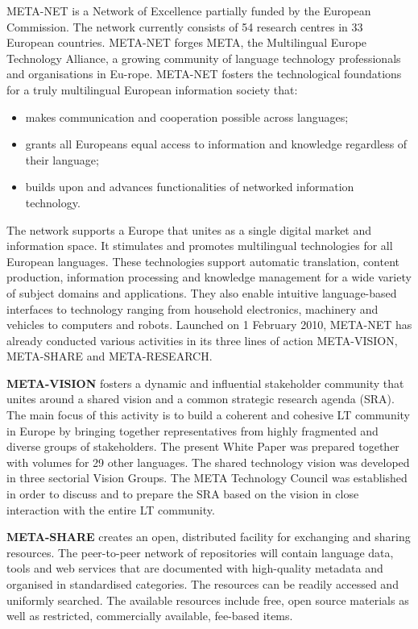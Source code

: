 \begin{multicols}{2}

META-NET is a Network of Excellence partially funded by the European Commission. The network currently consists of 54 research centres in 33 European countries\cite{rehm2011}. META-NET forges META, the Multilingual Europe Technology Alliance, a growing community of language technology professionals and organisations in Eu-rope. META-NET fosters the technological foundations for a truly multilingual European information society that:

\begin{itemize}
\item makes communication and cooperation possible across languages;
\item grants all Europeans equal access to information and knowledge regardless of their language;
\item builds upon and advances functionalities of networked information technology.
\end{itemize}

The network supports a Europe that unites as a single digital market and information space. It stimulates and promotes multilingual technologies for all European languages. These technologies support automatic translation, content production, information processing and knowledge management for a wide variety of subject domains and applications. They also enable intuitive language-based interfaces to technology ranging from household electronics, machinery and vehicles to computers and robots.
Launched on 1 February 2010, META-NET has already conducted various activities in its three lines of action META-VISION, META-SHARE and META-RESEARCH.

\textbf{META-VISION} fosters a dynamic and influential stakeholder community that unites around a shared vision and a common strategic research agenda (SRA). The main focus of this activity is to build a coherent and cohesive LT community in Europe by bringing together representatives from highly fragmented and diverse groups of stakeholders. The present White Paper was prepared together with volumes for 29 other languages. The shared technology vision was developed in three sectorial Vision Groups. The META Technology Council was established in order to discuss and to prepare the SRA based on the vision in close interaction with the entire LT community.

\textbf{META-SHARE} creates an open, distributed facility for exchanging and sharing resources. The peer-to-peer network of repositories will contain language data, tools and web services that are documented with high-quality metadata and organised in standardised categories. The resources can be readily accessed and uniformly searched. The available resources include free, open source materials as well as restricted, commercially available, fee-based items.


\end{multicols}
